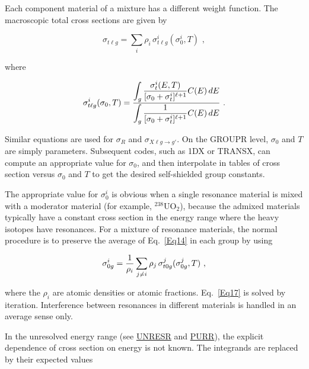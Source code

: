 Each component material of a mixture has a different weight function.
The macroscopic total cross sections are given by

  \begin{equation}
    \sigma_{t\ell g}=\sum_i \rho_i \,\sigma_{t\ell g}^i(\sigma_0^i,T)\,\,,
  \end{equation}

\noindent
where

  \begin{equation}
    \sigma_{t\ell g}^i(\sigma_0,T)=
    {{\displaystyle\int_g {{\sigma_t^i(E,T)}\over
    {[\sigma_0+\sigma_t^i]^{\ell+1}}}
    C(E)\,dE}\over
    {\displaystyle\int_g{{1}\over
    {[\sigma_0+\sigma_t^i]^{\ell+1}}} C(E)\,dE}}\,\,.
  \end{equation}

\noindent
Similar equations are used for $\sigma_R$ and $\sigma_{X\ell g\rightarrow g'}$.
On the GROUPR level, $\sigma_0$ and $T$ are simply parameters.  Subsequent
codes, such as 1DX\cite{1DX} or TRANSX\cite{TRANSX,TRANSX2},
 can compute an appropriate value for $\sigma_0$, and then
interpolate in tables of cross section versus $\sigma_0$ and $T$ to get
the desired self-shielded group constants.

The appropriate value for $\sigma_0^i$ is obvious
when a single resonance material is mixed with a moderator material
(for example, $^{238}$UO$_2$), because the admixed materials typically
have a constant cross section in the energy range where the heavy isotopes
have resonances.  For a mixture of resonance materials, the normal procedure
is to preserve the average of Eq.~\ref{Eq14} in each group by using

  \begin{equation}
    \sigma_{0g}^i={{1}\over{\rho_i}}
    \sum_{j\ne i}\rho_j \,\sigma_{t0g}^j(\sigma_{0g}^j,T)\,\,,
  \label{Eq17}
  \end{equation}

\noindent
where the $\rho_i$ are atomic densities or atomic fractions.
Eq.~\ref{Eq17} is solved by iteration.  Interference between resonances
in different materials is handled in an average sense only.

In the unresolved energy range
(see \hyperlink{sUNRESRhy}{UNRESR} and
\hyperlink{sPURRhy}{PURR}), the explicit dependence
of cross section on energy is not known.  The integrands are replaced
by their expected values

